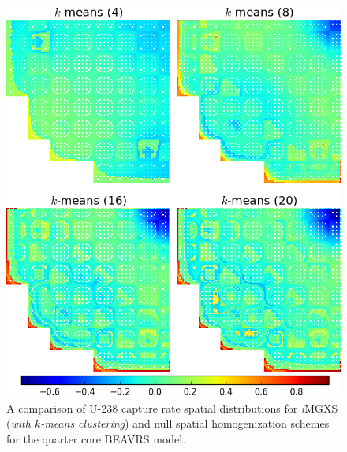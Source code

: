 \begin{figure}[h!]
\centering
\includegraphics[width=0.9\linewidth]{figures/results/compare/full-core/compare-capt-kmeans}
\vspace{2mm}
\caption[U-238 capture rate comparison for the quarter core BEAVRS model]{A comparison of U-238 capture rate spatial distributions for \textit{i}\ac{MGXS} (\textit{with $k$-means clustering}) and null spatial homogenization schemes for the quarter core BEAVRS model.}
\label{fig:chap11-assm-full-core-capt-rates-kmeans-comp}
\end{figure}

\clearpage

